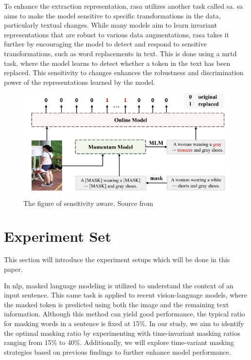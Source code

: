 To enhance the extraction representation, \acrshort{rasa} utilizes another task called \acrfull{sa}. \acrshort{sa} aims to make the model sensitive to specific transformations in the data, particularly textual changes. While many models aim to learn invariant representations that are robust to various data augmentations, \acrshort{rasa} takes it further by encouraging the model to detect and respond to sensitive transformations, such as word replacements in text. This is done using a \acrshort{mrtd} task, where the model learns to detect whether a token in the text has been replaced. This sensitivity to changes enhances the robustness and discrimination power of the representations learned by the model.

\begin{figure}[htbp]
  \includegraphics[width=\linewidth]{img/rasa_sensitivity_aware.png}
  \caption{The figure of sensitivity aware. Source from \cite{Bai2023RaSaRA} }
  \label{img:rasa_sa}
\end{figure}


\section{Experiment Set}
This section will introduce the experiment setups which will be done in this paper.

In \acrshort{nlp}, masked language modeling is utilized to understand the context of an input sentence. This same task is applied to recent vision-language models, where the masked token is predicted using both the image and the remaining text information. Although this method can yield good performance, the typical ratio for masking words in a sentence is fixed at 15\%. 
In our study, we aim to identify the optimal masking ratio by experimenting with time-invariant masking ratios ranging from 15\% to 40\%. Additionally, we will explore time-variant masking strategies based on previous findings to further enhance model performance.


